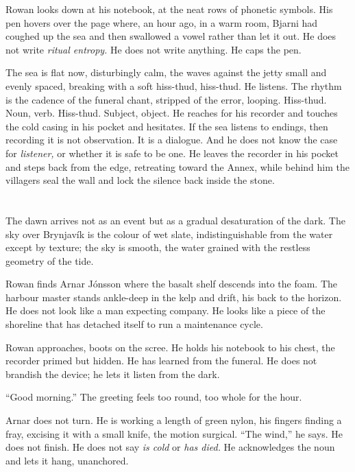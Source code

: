 \documentclass[11pt,oneside]{book}
\begin{document}
Rowan looks down at his notebook, at the neat rows of phonetic symbols.
His pen hovers over the page where, an hour ago, in a warm room, Bjarni
had coughed up the sea and then swallowed a vowel rather than let it
out. He does not write \emph{ritual entropy.} He does not write
anything. He caps the pen.

The sea is flat now, disturbingly calm, the waves against the jetty
small and evenly spaced, breaking with a soft hiss-thud, hiss-thud. He
listens. The rhythm is the cadence of the funeral chant, stripped of the
error, looping. Hiss-thud. Noun, verb. Hiss-thud. Subject, object. He
reaches for his recorder and touches the cold casing in his pocket and
hesitates. If the sea listens to endings, then recording it is not
observation. It is a dialogue. And he does not know the case for
\emph{listener,} or whether it is safe to be one. He leaves the recorder
in his pocket and steps back from the edge, retreating toward the Annex,
while behind him the villagers seal the wall and lock the silence back
inside the stone.

\chapter{}

The dawn arrives not as an event but as a gradual desaturation of the
dark. The sky over Brynjavík is the colour of wet slate,
indistinguishable from the water except by texture; the sky is smooth,
the water grained with the restless geometry of the tide.

Rowan finds Arnar Jónsson where the basalt shelf descends into the foam.
The harbour master stands ankle-deep in the kelp and drift, his back to
the horizon. He does not look like a man expecting company. He looks
like a piece of the shoreline that has detached itself to run a
maintenance cycle.

Rowan approaches, boots on the scree. He holds his notebook to his
chest, the recorder primed but hidden. He has learned from the funeral.
He does not brandish the device; he lets it listen from the dark.

``Good morning.'' The greeting feels too round, too whole for the hour.

Arnar does not turn. He is working a length of green nylon, his fingers
finding a fray, excising it with a small knife, the motion surgical.
``The wind,'' he says. He does not finish. He does not say \emph{is
cold} or \emph{has died.} He acknowledges the noun and lets it hang,
unanchored.
\end{document}
